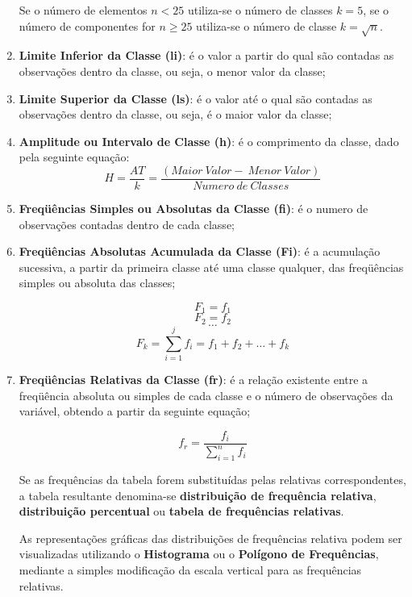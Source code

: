 \begin{enumerate}
Se o número de elementos $n < 25$  utiliza-se o número de classes $k= 5$, se o número de componentes for
$n \geq 25$  utiliza-se o número de classe $k=\sqrt{n}$.
  \item \textbf{Limite Inferior da Classe (li)}: é o valor a partir do qual são contadas as observações dentro da classe, ou seja, o menor valor da classe;
  \item \textbf{Limite Superior da Classe (ls)}: é o valor até o qual são contadas as observações dentro da classe, ou seja, é o maior valor da classe;
  \item \textbf{Amplitude ou Intervalo de Classe (h)}: é o comprimento da classe, dado pela seguinte equação:
      \begin{equation}\label{}
        H=\frac{AT}{k}=\frac{(Maior \ Valor - \ Menor \ Valor)}{Numero \ de \ Classes}
      \end{equation}
  \item \textbf{Freqüências Simples ou Absolutas da Classe (fi)}: é o numero de observações contadas dentro de cada classe;
  \item \textbf{Freqüências Absolutas Acumulada da Classe (Fi)}: é a acumulação sucessiva, a partir da primeira classe até uma classe qualquer, das freqüências simples ou absoluta das classes;


      $$ F_{1}= f_{1} $$
      $$ F_{2}= f_{2} $$
      $$ \ldots  $$
      $$ F_{k}=  \sum_{i=1}^{j}f_{i} = f_{1}+f_{2}+\ldots+ f_{k}$$


  \item \textbf{Freqüências Relativas da Classe (fr)}: é a relação existente entre a freqüência absoluta ou simples de cada classe e o número de observações da variável, obtendo a partir da seguinte equação;

      \begin{equation}\label{}
        f_{r}=\frac{f_{i}}{\sum_{i=1}^{n}f_{i}}
      \end{equation}

Se as frequências da tabela forem substituídas pelas relativas correspondentes, a tabela resultante denomina-se \textbf{distribuição de frequência relativa}, \textbf{distribuição percentual} ou \textbf{tabela de frequências relativas}.\vskip0.3cm

As representações gráficas das distribuições de frequências relativa podem ser visualizadas utilizando o \textbf{Histograma} ou o \textbf{Polígono de Frequências}, mediante a simples modificação da escala vertical para as frequências relativas.




\end{enumerate}
